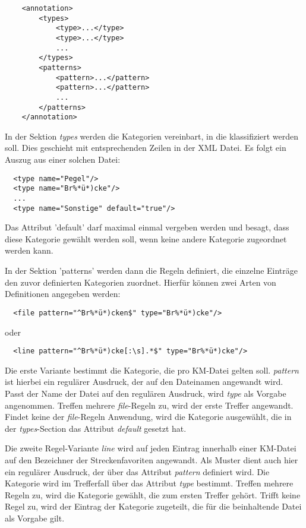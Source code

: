 \begin{lstlisting}
    <annotation>
        <types>
            <type>...</type>
            <type>...</type>
            ...
        </types>
        <patterns>
            <pattern>...</pattern>
            <pattern>...</pattern>
            ...
        </patterns>
    </annotation>
\end{lstlisting}

In der Sektion \textit{types} werden die Kategorien vereinbart, in die klassifiziert
werden soll. Dies geschieht mit entsprechenden Zeilen in der XML Datei. Es folgt
ein Auszug aus einer solchen Datei:

\begin{lstlisting}
  <type name="Pegel"/>
  <type name="Br%*ü*)cke"/>
  ...
  <type name="Sonstige" default="true"/>
\end{lstlisting}

Das Attribut 'default' darf maximal einmal vergeben werden und besagt, dass diese
Kategorie gewählt werden soll, wenn keine andere Kategorie zugeordnet werden kann.

In der Sektion 'patterns' werden dann die Regeln definiert, die einzelne Einträge
den zuvor definierten Kategorien zuordnet. Hierfür können zwei Arten von
Definitionen angegeben werden:

\begin{lstlisting}
  <file pattern="^Br%*ü*)cken$" type="Br%*ü*)cke"/>
\end{lstlisting}

oder

\begin{lstlisting}
  <line pattern="^Br%*ü*)cke[:\s].*$" type="Br%*ü*)cke"/>
\end{lstlisting}

Die erste Variante bestimmt die Kategorie, die pro KM-Datei gelten soll.
\textit{pattern} ist hierbei ein regulärer Ausdruck, der auf den Dateinamen
angewandt wird. Passt der Name der Datei auf den regulären Ausdruck, wird
\textit{type} als Vorgabe angenommen. Treffen mehrere \textit{file}-Regeln zu,
wird der erste Treffer angewandt. Findet keine der \textit{file}-Regeln Anwendung, wird
die Kategorie ausgewählt, die in der \textit{types}-Section das Attribut
\textit{default} gesetzt hat.

Die zweite Regel-Variante \textit{line} wird auf jeden Eintrag innerhalb einer KM-Datei
auf den Bezeichner der Streckenfavoriten angewandt. Als Muster dient auch hier
ein regulärer Ausdruck, der über das Attribut \textit{pattern} definiert wird.
Die Kategorie wird im Trefferfall über das Attribut \textit{type} bestimmt.
Treffen mehrere Regeln zu, wird die Kategorie gewählt, die zum ersten Treffer
gehört. Trifft keine Regel zu, wird der Eintrag der Kategorie zugeteilt, die für
die beinhaltende Datei als Vorgabe gilt.


